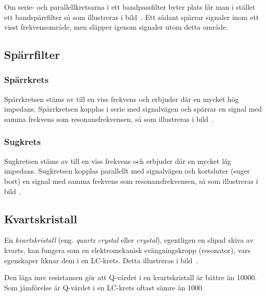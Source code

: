 Om serie- och parallellkretsarna i ett bandpassfilter byter plats får man
i stället ett bandspärrfilter så som illustreras i bild~.
Ett sådant spärrar signaler inom ett visst frekvensområde, men släpper igenom
signaler utom detta område.


\subsection{Spärrfilter}

\subsubsection{Spärrkrets}
Spärrkretsen stäms av till en viss frekvens och erbjuder där en mycket hög
impedans.
Spärrkretsen kopplas i serie med signalvägen och spärrar en signal med samma
frekvens som resonansfrekvensen, så som illustreras i bild~.

\subsubsection{Sugkrets}
Sugkretsen stäms av till en viss frekvens och erbjuder där en mycket låg
impedans.
Sugkretsen kopplas parallellt med signalvägen och kortsluter (suger bort) en
signal med samma frekvens som resonansfrekvensen, så som illustreras i bild
.


\subsection{Kvartskristall}



En \emph{kvartskristall} (eng. \emph{quartz crystal} eller \emph{crystal}),
egentligen en slipad skiva av kvarts, kan fungera som en
elektromekanisk svängningskropp (resonator), vars egenskaper liknar dem i en
LC-krets.
Detta illustreras i bild~.

Den låga inre resistansen gör att Q-värdet i en kvartskristall är bättre än
\num{10000}.
Som jämförelse är Q-värdet i en LC-krets oftast sämre än \num{1000}.

